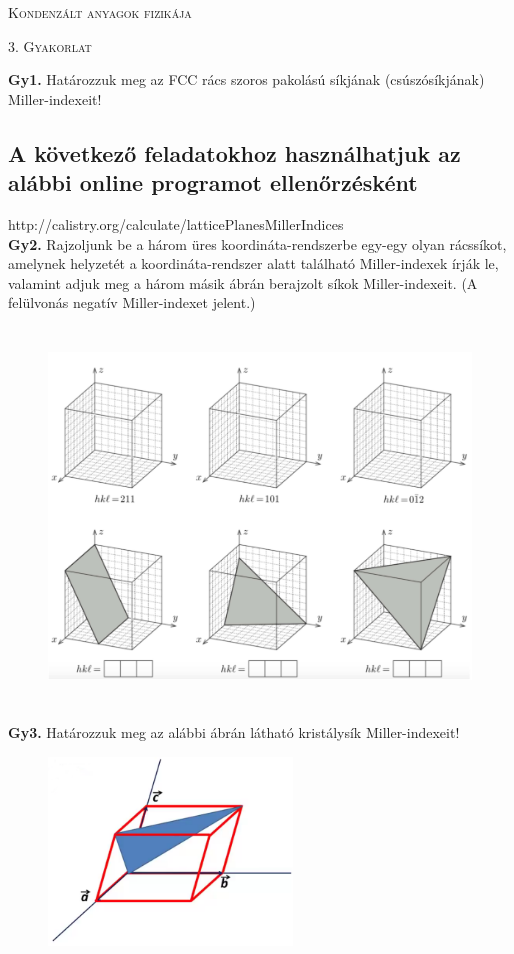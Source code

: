 \documentclass[12pt]{article}
\begin{document}
\centerline{
\textsc{\Large{ Kondenzált anyagok fizikája}}
}
\centerline{ 
\textsc{\large{3. Gyakorlat}}
}
\vspace{10mm}

\textbf{Gy1.} Határozzuk meg az FCC rács szoros pakolású síkjának (csúszósíkjának) Miller-indexeit!
\\

\subsection*{A következő feladatokhoz használhatjuk az alábbi online programot ellenőrzésként}
http://calistry.org/calculate/latticePlanesMillerIndices
\\


\textbf{Gy2.} Rajzoljunk be a három üres koordináta-rendszerbe egy-egy olyan rácssíkot, amelynek helyzetét a koordináta-rendszer alatt található Miller-indexek írják le, valamint adjuk meg a három másik ábrán berajzolt síkok Miller-indexeit. (A felülvonás negatív Miller-indexet jelent.)
\begin{figure}[h!]
\begin{center}
\includegraphics[height=10cm]{../images/kristalysikok.png} 
\end{center}
\end{figure}


\pagebreak
\textbf{Gy3.} Határozzuk meg az alábbi ábrán látható kristálysík Miller-indexeit!
\begin{figure}[h!]
\begin{center}
\includegraphics[height=5cm]{../images/ferdeszogu-11m1.png} 
\end{center}
\end{figure}
\\
\end{document}

